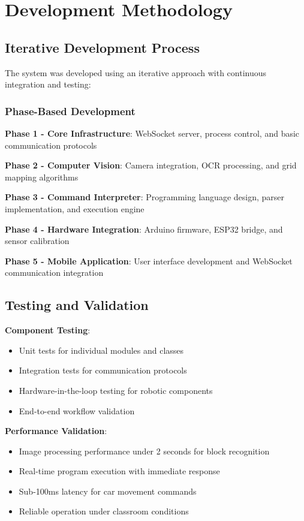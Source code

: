 \section{Development Methodology}

\subsection{Iterative Development Process}

The system was developed using an iterative approach with continuous integration and testing:

\subsubsection{Phase-Based Development}
\textbf{Phase 1 - Core Infrastructure}: WebSocket server, process control, and basic communication protocols

\textbf{Phase 2 - Computer Vision}: Camera integration, OCR processing, and grid mapping algorithms

\textbf{Phase 3 - Command Interpreter}: Programming language design, parser implementation, and execution engine

\textbf{Phase 4 - Hardware Integration}: Arduino firmware, ESP32 bridge, and sensor calibration

\textbf{Phase 5 - Mobile Application}: User interface development and WebSocket communication integration

\subsection{Testing and Validation}

\textbf{Component Testing}:
\begin{itemize}
    \item Unit tests for individual modules and classes
    \item Integration tests for communication protocols
    \item Hardware-in-the-loop testing for robotic components
    \item End-to-end workflow validation
\end{itemize}

\textbf{Performance Validation}:
\begin{itemize}
    \item Image processing performance under 2 seconds for block recognition
    \item Real-time program execution with immediate response
    \item Sub-100ms latency for car movement commands
    \item Reliable operation under classroom conditions
\end{itemize}

